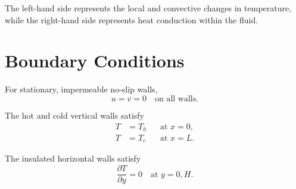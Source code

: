 \documentclass{article}
\begin{document}
The left-hand side represents the local and convective
changes in temperature, while the right-hand side represents
heat conduction within the fluid.

\section{Boundary Conditions}

For stationary, impermeable no-slip walls,
\begin{equation}
u=v=0
\quad \text{on all walls}.
\end{equation}

The hot and cold vertical walls satisfy
\begin{align}
T&=T_h &&\text{at }x=0,\\
T&=T_c &&\text{at }x=L.
\end{align}

The insulated horizontal walls satisfy
\begin{equation}
\frac{\partial T}{\partial y}=0
\quad\text{at }y=0,H.
\end{equation}
\end{document}

